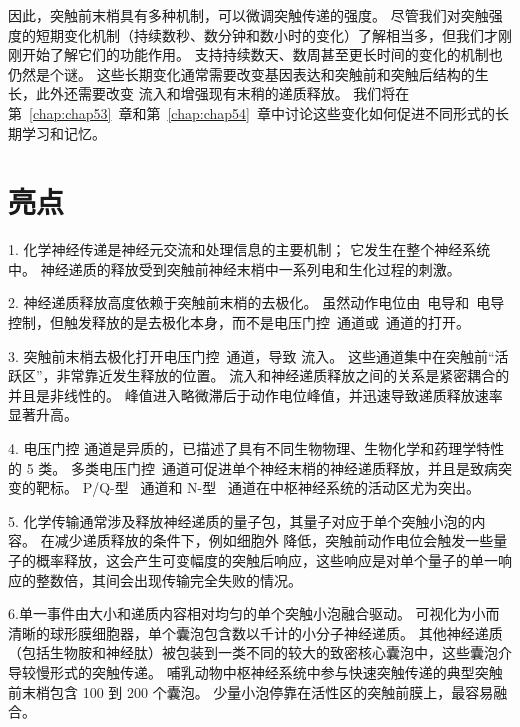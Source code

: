 因此，突触前末梢具有多种机制，可以微调突触传递的强度。
尽管我们对突触强度的短期变化机制（持续数秒、数分钟和数小时的变化）了解相当多，但我们才刚刚开始了解它们的功能作用。
支持持续数天、数周甚至更长时间的变化的机制也仍然是个谜。
这些长期变化通常需要改变基因表达和突触前和突触后结构的生长，此外还需要改变  流入和增强现有末稍的递质释放。
我们将在第~\ref{chap:chap53}~章和第~\ref{chap:chap54}~章中讨论这些变化如何促进不同形式的长期学习和记忆。



\section{亮点}

1. 化学神经传递是神经元交流和处理信息的主要机制； 它发生在整个神经系统中。
神经递质的释放受到突触前神经末梢中一系列电和生化过程的刺激。


2. 神经递质释放高度依赖于突触前末梢的去极化。
虽然动作电位由~电导和~电导控制，但触发释放的是去极化本身，而不是电压门控~通道或~通道的打开。


3. 突触前末梢去极化打开电压门控~通道，导致  流入。
这些通道集中在突触前“活跃区”，非常靠近发生释放的位置。
 流入和神经递质释放之间的关系是紧密耦合的并且是非线性的。
 峰值进入略微滞后于动作电位峰值，并迅速导致递质释放速率显著升高。 


4. 电压门控 通道是异质的，已描述了具有不同生物物理、生物化学和药理学特性的 5 类。
多类电压门控~通道可促进单个神经末梢的神经递质释放，并且是致病突变的靶标。
P/Q-型~ 通道和 N-型~ 通道在中枢神经系统的活动区尤为突出。


5. 化学传输通常涉及释放神经递质的量子包，其量子对应于单个突触小泡的内容。
在减少递质释放的条件下，例如细胞外  降低，突触前动作电位会触发一些量子的概率释放，这会产生可变幅度的突触后响应，这些响应是对单个量子的单一响应的整数倍，其间会出现传输完全失败的情况。


6.单一事件由大小和递质内容相对均匀的单个突触小泡融合驱动。
可视化为小而清晰的球形膜细胞器，单个囊泡包含数以千计的小分子神经递质。
其他神经递质（包括生物胺和神经肽）被包装到一类不同的较大的致密核心囊泡中，这些囊泡介导较慢形式的突触传递。
哺乳动物中枢神经系统中参与快速突触传递的典型突触前末梢包含 100 到 200 个囊泡。
少量小泡停靠在活性区的突触前膜上，最容易融合。


